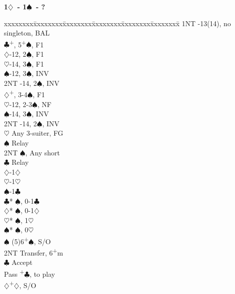 \documentclass[10pt]{article}
\renewcommand{\c}{$\clubsuit$}
\renewcommand{\d}{$\diamondsuit$}
\newcommand{\h}{$\heartsuit$}
\newcommand{\s}{$\spadesuit$}
\newcommand{\p}{\textsuperscript{+}}
\newenvironment{bidtable}[1][]
{\textbf{#1}
  \begin{adjustwidth}{1em}{}
    \addvspace{2pt}
    \begin{tabbing}
      xxxxxxxx\=xxxxxxxx\=xxxxxxxx\=xxxxxxxx\=xxxxxxxx\=xxxxxxxx\=\kill}
{\end{tabbing}\end{adjustwidth}\bigskip}%
\begin{document}
\begin{multicols*}{2}
\begin{bidtable}[1\d\ - 1\s\ - ?]
1NT  -13(14), no singleton, BAL                   \\
     \c  {}\p, 5\p\s, F1                         \\
     \>      \d {}-12, 2\s, F1                  \\
     \>      \h {}-14, 3\s, F1                  \\
     \>      \s {}-12, 3\s, INV                 \\
     \>      \> 2NT -14, 2\s, INV                 \\
     \d  {}\p, 3-4\s, F1                         \\
     \>      \h {}-12, 2-3\s, NF                \\
     \>      \s {}-14, 3\s, INV                 \\
     \>      \> 2NT -14, 2\s, INV                 \\
     \h  \> Any 3-suiter, FG                       \\
     \>      \s \> Relay                           \\
     \>      \>     \> 2NT  \s, Any short          \\
     \>      \>     \>      \c \> Relay            \\
     \>      \>     \>      \>     \d{}-1\d     \\
     \>      \>     \>      \>     \h{}-1\h     \\
     \>      \>     \>      \>     \s{}-1\c     \\
     \>      \>     \c* {}\s, 0-1\c              \\
     \>      \>     \d* {}\s, 0-1\d              \\
     \>      \>     \h* {}\s, 1\h                \\
     \>      \>     \s* {}\s, 0\h                \\
     \s  \> (5)6\p\s, S/O                          \\
     \> 2NT  \> Transfer, 6\p m                        \\
     \>      \c \> Accept                          \\
     \>      \>     \> Pass \p\c, to play          \\
     \>      \>     \d  {}\p\d, S/O              \\

\end{bidtable}
\end{multicols*}
\end{document}
